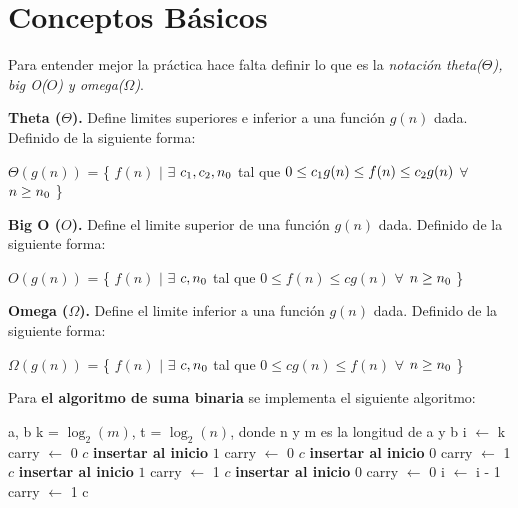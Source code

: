 \documentclass[12pt,twoside]{article}
\begin{document}
\section{Conceptos B\'asicos}
Para entender mejor la pr\'actica hace falta definir lo que es la \textit{notaci\'on theta($\Theta$), big O($O$) y omega($\Omega$)}.
\newline

\textbf{Theta ($\Theta$).} Define limites superiores e inferior a una funci\'on $g(n)$ dada. Definido de la siguiente forma: 
\begin{center}
    $\Theta(g(n))$ = \{ $f(n)$ $|$ $\exists$  $c\textsubscript{1}, c\textsubscript{2}, n\textsubscript{0}$ tal que $0 \leq c\textsubscript{1}g(n)\leq f(n)\leq c\textsubscript{2}g(n)$ $\forall$ $n\geq n\textsubscript{0}$ \}
\end{center}

\textbf{Big O ($O$).} Define el limite superior de una funci\'on $g(n)$ dada. Definido de la siguiente forma: 
\begin{center}
    $O(g(n))$ = \{ $f(n)$ $|$ $\exists$  $c, n\textsubscript{0}$ tal que $0 \leq f(n)\leq cg(n)$ $\forall$ $n\geq n\textsubscript{0}$ \}
\end{center}

\textbf{Omega ($\Omega$).} Define el limite inferior a una funci\'on $g(n)$ dada. Definido de la siguiente forma: 
\begin{center}
    $\Omega(g(n))$ = \{ $f(n)$ $|$ $\exists$  $c, n\textsubscript{0}$ tal que $0 \leq cg(n)\leq f(n)$ $\forall$ $n\geq n\textsubscript{0}$ \}
\end{center}

Para \textbf{el algoritmo de suma binaria} se implementa el siguiente algoritmo:
\begin{algorithmic}
    \Require a, b
    \Ensure k = $\log_{2} (m)$, t = $\log_{2} (n)$, donde n y m es la longitud de a y b
    \State i $\longleftarrow$ k
    \State carry $\longleftarrow$ 0
            \State $c$ \textbf{insertar al inicio} $1$
            \State carry $\longleftarrow$ 0
            \State $c$ \textbf{insertar al inicio} $0$
            \State carry $\longleftarrow$ 1
            \State $c$ \textbf{insertar al inicio} $1$
            \State carry $\longleftarrow$ 1
        \Else
            \State $c$ \textbf{insertar al inicio} $0$
            \State carry $\longleftarrow$ 0
        \EndIf
        \State i $\longleftarrow$ i - 1
    \EndWhile
        \State carry $\longleftarrow$ 1
    \EndIf
    \State \Return c
    
\end{algorithmic}
\end{document}
